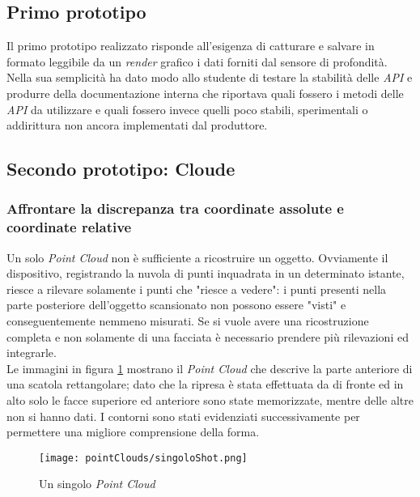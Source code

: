 \subsection{Primo prototipo}
Il primo prototipo realizzato risponde all'esigenza di catturare e salvare in formato leggibile da un \emph{render} grafico i dati forniti dal sensore di profondità.
Nella sua semplicità ha dato modo allo studente di testare la stabilità delle \emph{API} e produrre della documentazione interna che riportava quali fossero i metodi delle \emph{API} da utilizzare e quali fossero invece quelli poco stabili, sperimentali o addirittura non ancora implementati dal produttore.

\subsection{Secondo prototipo: Cloude}
\subsubsection{Affrontare la discrepanza tra coordinate assolute e coordinate relative}
Un solo \emph{Point Cloud} non è sufficiente a ricostruire un oggetto. Ovviamente il dispositivo, registrando la nuvola di punti inquadrata in un determinato istante, riesce a rilevare solamente i punti che "riesce a vedere": i punti presenti nella parte posteriore dell'oggetto scansionato non possono essere "visti" e conseguentemente nemmeno misurati. Se si vuole avere una ricostruzione completa e non solamente di una facciata è necessario prendere più rilevazioni ed integrarle.\\
Le immagini in figura \ref{figure:singolo_pointCloud} mostrano il \emph{Point Cloud} che descrive la parte anteriore di una scatola rettangolare; dato che la ripresa è stata effettuata da di fronte ed in alto solo le facce superiore ed anteriore sono state memorizzate, mentre delle altre non si hanno dati. I contorni sono stati evidenziati successivamente per permettere una migliore comprensione della forma.
\begin{figure}[H] 
    \centering 
    \texttt{[image: pointClouds/singoloShot.png]} 
    \caption{Un singolo \emph{Point Cloud}}
    \label{figure:singolo_pointCloud}
\end{figure}
